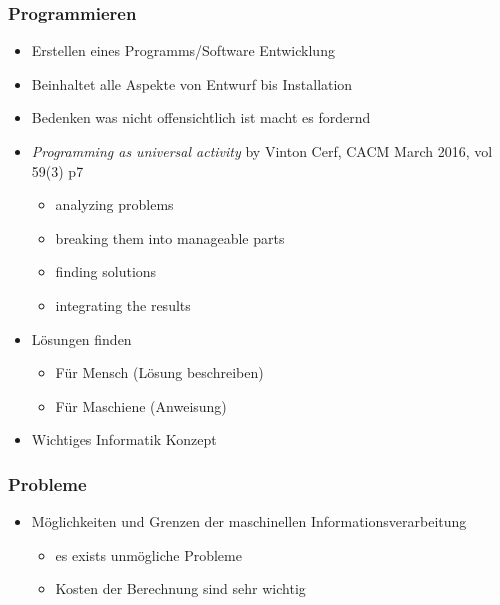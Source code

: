 \documentclass[11pt]{article}
\begin{document}
\subsubsection{Programmieren}
\label{sec:orga9a09fd}
\begin{itemize}
\item Erstellen eines Programms/Software Entwicklung\\
\item Beinhaltet alle Aspekte von Entwurf bis Installation\\
\item Bedenken was nicht offensichtlich ist macht es fordernd\\
\item \emph{Programming as universal activity} by Vinton Cerf, CACM March 2016, vol 59(3) p7\\
\begin{itemize}
\item analyzing problems\\
\item breaking them into manageable parts\\
\item finding solutions\\
\item integrating the results\\
\end{itemize}
\item Lösungen finden\\
\begin{itemize}
\item Für Mensch (Lösung beschreiben)\\
\item Für Maschiene (Anweisung)\\
\end{itemize}
\item Wichtiges Informatik Konzept\\
\end{itemize}

\subsubsection{Probleme}
\label{sec:org69cc7d5}
\begin{itemize}
\item Möglichkeiten und Grenzen der maschinellen Informationsverarbeitung\\
\begin{itemize}
\item es exists unmögliche Probleme\\
\item Kosten der Berechnung sind sehr wichtig\\
\end{itemize}
\end{itemize}
\end{document}
